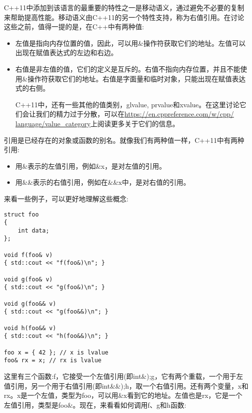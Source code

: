 C++11中添加到该语言的最重要的特性之一是移动语义，通过避免不必要的复制来帮助提高性能。移动语义由C++11的另一个特性支持，称为右值引用。在讨论这些之前，值得一提的是，在C++中有两种值:

\begin{itemize}
\item
左值是指向内存位置的值，因此，可以用\&操作符获取它们的地址。左值可以出现在赋值表达式的左边和右边。

\item
右值是非左值的值，它们的定义是互斥的。右值不指向内存位置，并且不能使用\&操作符获取它们的地址。右值是字面量和临时对象，只能出现在赋值表达式的右侧。

\begin{tcolorbox}[breakable,enhanced jigsaw,colback=blue!5!white,colframe=blue!75!black,title={Note}]
C++11中，还有一些其他的值类别，glvalue, prvalue和xvalue。在这里讨论它们会让我们的精力过于分散，可以在\url{https://en.cppreference.com/w/cpp/ language/value_category}上阅读更多关于它们的信息。
\end{tcolorbox}

\end{itemize}

引用是已经存在的对象或函数的别名。就像我们有两种值一样，C++11中有两种引用:

\begin{itemize}
\item
用\&表示的左值引用，例如\&x，是对左值的引用。

\item
用\&\&表示的右值引用，例如在\&\&x中，是对右值的引用。
\end{itemize}

来看一些例子，可以更好地理解这些概念:

\begin{lstlisting}[style=styleCXX]
struct foo
{
	int data;
};

void f(foo& v)
{ std::cout << "f(foo&)\n"; }

void g(foo& v)
{ std::cout << "g(foo&)\n"; }

void g(foo&& v)
{ std::cout << "g(foo&&)\n"; }

void h(foo&& v)
{ std::cout << "h(foo&&)\n"; }

foo x = { 42 }; // x is lvalue
foo& rx = x; // rx is lvalue
\end{lstlisting}

这里有三个函数:f，它接受一个左值引用(即int\&);g，它有两个重载，一个用于左值引用，另一个用于右值引用(即int\&\&);h，取一个右值引用。还有两个变量，x和rx。x是一个左值，类型为foo，可以用\&x看到它的地址。左值也是rx，它是一个左值引用，类型是foo\&。现在，来看看如何调用f、g和h函数:

